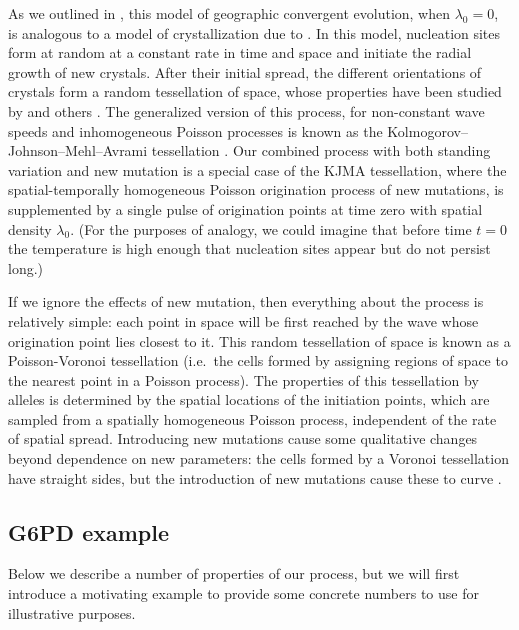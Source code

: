 \documentclass{article}
\begin{document}
As we outlined in \citet{ralphcoop2010}, this model of
geographic convergent evolution, when $\lambda_0=0$, is analogous to a model of crystallization due to \citet{kolmogorov-crystallization}.
In this model, nucleation sites form at random at a constant rate in time and space 
and initiate the radial growth of new crystals. 
After their initial spread, the different orientations of crystals form a random tessellation of space,
whose properties have been studied by \citet{moller92,moller95} and others \citep{bollobas-crystallization,gilbert-crystallization}. 
The generalized version of this process, for non-constant wave speeds
and inhomogeneous Poisson processes is known as the 
Kolmogorov--Johnson--Mehl--Avrami tessellation \citep{fanfoni-tomellini}.
Our combined process with both standing variation and new mutation is
a special case of the KJMA tessellation, 
where the spatial-temporally homogeneous Poisson origination process of new mutations, 
is supplemented by a single pulse of origination points at time zero with spatial density $\lambda_0$.
(For the purposes of analogy, we could imagine that before time $t=0$
the temperature is high enough that nucleation sites appear but do not persist long.)

If we ignore the effects of new mutation,
then everything about the process is relatively simple:
each point in space will be first reached by the wave whose origination point lies closest to it.
This random tessellation of space is known as a Poisson-Voronoi tessellation \citep{Moller:94}
(i.e.\ the cells formed by assigning regions of space to the nearest point in a Poisson process).
The properties of this tessellation by alleles is
determined by the spatial locations of the initiation points, 
which are sampled from a spatially homogeneous Poisson process, 
independent of the rate of spatial spread. 
Introducing new mutations cause some qualitative changes
beyond dependence on new parameters:
the cells formed by a Voronoi tessellation have straight sides,
but the introduction of new mutations cause these to curve
\citep[because the radii of the colliding circles differ; see Figure 1 of ][ for a graphical depiction of this point]{ralphcoop2010}.


\subsection{G6PD example}

Below we describe a number of properties of our process, but we will first introduce 
a motivating example to provide some concrete
numbers to use for illustrative purposes.
\end{document}
